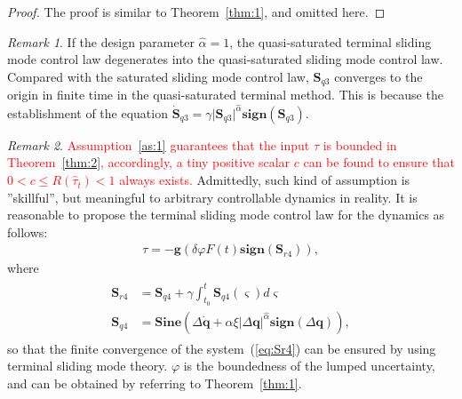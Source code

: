 \documentclass[3p]{elsarticle}
\theoremstyle{plain}
\theoremstyle{remark}
\newtheorem{myrem}{Remark}
\begin{document}
\begin{proof}
The proof is similar to Theorem~\ref{thm:1}, and omitted here.
\end{proof}
\begin{myrem}
If the design parameter $\hat\alpha = 1$, the quasi-saturated terminal sliding mode control law degenerates into the quasi-saturated sliding mode control law. Compared with the saturated sliding mode control law, $\bm S_{q3}$ converges to the origin in finite time in the quasi-saturated terminal method. This is because the establishment of the equation $\dot {\bm S}_{q3} = \gamma\vert \bm S_{q3}\vert^{\hat\alpha} \bm{ sign}(\bm S_{q3})$.
\end{myrem}
\begin{myrem}
\textcolor{red}{Assumption~\ref{as:1} guarantees that the input $\tau$ is bounded in Theorem~\ref{thm:2}, accordingly, a tiny positive scalar $c$ can be found to ensure that $0<c\le R(\hat\tau_t)<1$ always exists.} Admittedly, such kind of assumption is ''skillful'', but meaningful to arbitrary controllable dynamics in reality. It is reasonable to propose the terminal sliding mode control law for the dynamics as follows:
\begin{align}
\tau = -\bm{g}(\delta\varphi F(t) \bm{sign}(\bm S_{r4})),
\end{align}
where
\begin{align}
\begin{split}
\bm S_{r4} &= \bm S_{q4}+\gamma\int^t_{t_0}\bm S_{q4}(\varsigma) d\varsigma\\
\bm S_{q4} &= \bm{Sine}(\Delta \dot {\bm q}+\alpha\xi\vert\Delta \bm q\vert^{\hat\alpha}\bm{sign}(\Delta \bm q)),\label{eq:Sr4}
\end{split}
\end{align}
so that the finite convergence of the system~(\ref{eq:Sr4}) can be ensured by using terminal sliding mode theory. $\varphi$ is the boundedness of the lumped uncertainty, and can be obtained by referring to Theorem~\ref{thm:1}.
\end{myrem}
\end{document}
